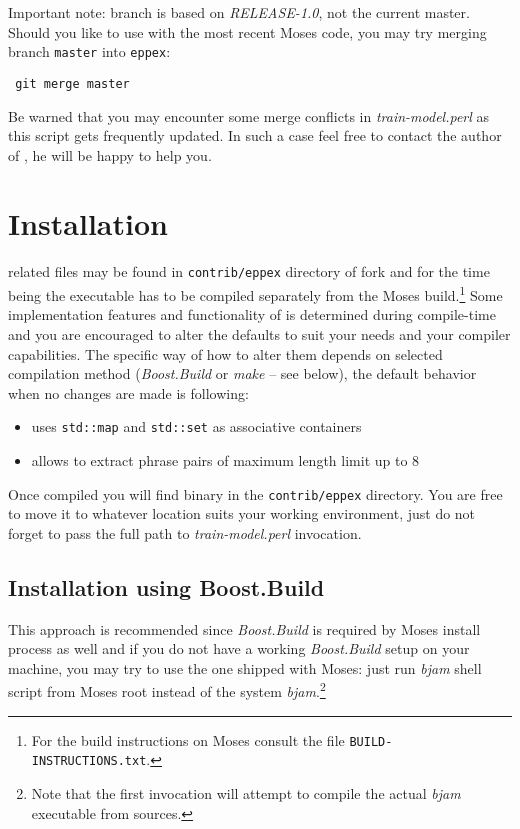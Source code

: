 Important note: \eppex{} branch is based on \emph{RELEASE-1.0},
not the current master. Should you like to use \eppex{} with the most
recent Moses code, you may try merging branch \texttt{master} into \texttt{eppex}:
\begin{verbatim}
 git merge master
\end{verbatim}

Be warned that you may encounter some merge conflicts in \emph{train-model.perl}
as this script gets frequently updated.
In such a case feel free to contact the author of \eppex{},
he will be happy to help you.

\section{Installation}

\Eppex{} related files may be found in \texttt{contrib/eppex} directory of \eppex{} fork
and for the time being the executable has to be compiled separately from the Moses
build.\footnote{For the build instructions on Moses consult the file \texttt{BUILD-INSTRUCTIONS.txt}.}
Some implementation features and functionality of \eppex{} is determined during compile-time
and you are encouraged to alter the defaults to suit your needs and your compiler capabilities.
The specific way of how to alter them depends on selected compilation method (\emph{Boost.Build} or
\emph{make} -- see below), the default behavior when no changes are made is following:
\begin{itemize}
  \item \eppex{} uses \verb|std::map| and \verb|std::set| as associative containers
  \item \eppex{} allows to extract phrase pairs of maximum length limit up to 8
\end{itemize}

Once compiled you will find \eppex{} binary in the \texttt{contrib/eppex} directory.
You are free to move it to whatever location suits your working environment,
just do not forget to pass the full path to \emph{train-model.perl} invocation.

\subsection*{Installation using Boost.Build}

This approach is recommended since \emph{Boost.Build}
is required by Moses install process as well and if you do not have a working
\emph{Boost.Build} setup on your machine, you may try to use the one shipped with Moses:
just run \emph{bjam} shell script from Moses root instead of the system \emph{bjam}.\footnote{Note
that the first invocation will attempt to compile the actual \emph{bjam} executable from sources.}

